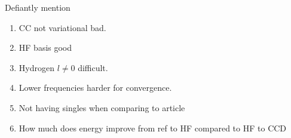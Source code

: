 Defiantly mention
\begin{enumerate}
    \item CC not variational bad.
    \item HF basis good
    \item Hydrogen $l \neq 0$ difficult.
    \item Lower frequencies harder for convergence.
    \item Not having singles when comparing to article
    \item How much does energy improve from ref to HF compared to HF to CCD
\end{enumerate} 


